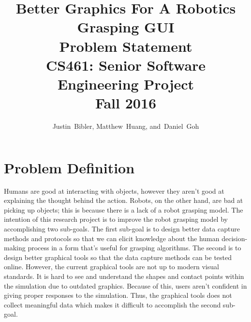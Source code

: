 \documentclass[10pt,journal,compsoc]{IEEEtran}
\begin{document}
\onecolumn
\begin{titlepage}
\title{Better Graphics For A Robotics Grasping GUI\\ Problem Statement \\  [0.5em] 
	\large CS461: Senior Software Engineering Project \\ Fall 2016}

\author{Justin~Bibler,
        Matthew~Huang,
        and~Daniel~Goh}
		

\maketitle

\end{titlepage}

\section{Problem Definition}
Humans are good at interacting with objects, however they aren't good at explaining the thought behind the action.
Robots, on the other hand, are bad at picking up objects; this is because there is a lack of a robot grasping model.
The intention of this research project is to improve the robot grasping model by accomplishing two sub-goals.
The first sub-goal is to design better data capture methods and protocols so that we can elicit knowledge about the human decision-making process in a form that's useful for grasping algorithms.
The second is to design better graphical tools so that the data capture methods can be tested online.
However, the current graphical tools are not up to modern visual standards.
It is hard to see and understand the shapes and contact points within the simulation due to outdated graphics.
Because of this, users aren't confident in giving proper responses to the simulation.
Thus, the graphical tools does not collect meaningful data which makes it difficult to accomplish the second sub-goal.
\end{document}
